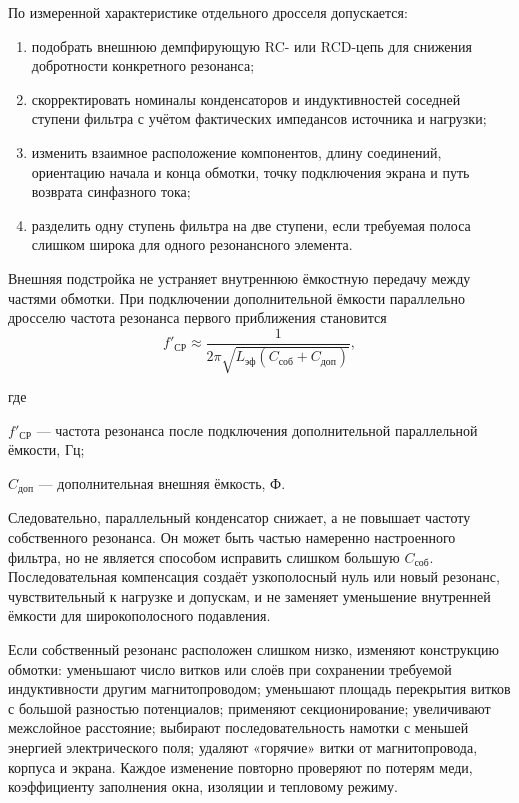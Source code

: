 \documentclass[14pt,a4paper]{extarticle}
\newenvironment{whereblock}
 {\par\noindent где\par
  \begin{list}{}{\setlength{\leftmargin}{12.5mm}
                  \setlength{\itemindent}{-12.5mm}
                  \setlength{\itemsep}{0pt}
                  \setlength{\parsep}{0pt}
                  \setlength{\topsep}{0pt}}}
 {\end{list}}
\newcommand{\whereitem}[2]{\item[] #1 --- #2}
\begin{document}
По измеренной характеристике отдельного дросселя допускается:
\begin{enumerate}
\item подобрать внешнюю демпфирующую RC- или RCD-цепь для снижения добротности
конкретного резонанса;
\item скорректировать номиналы конденсаторов и индуктивностей соседней
ступени фильтра с учётом фактических импедансов источника и нагрузки;
\item изменить взаимное расположение компонентов, длину соединений,
ориентацию начала и конца обмотки, точку подключения экрана и путь возврата
синфазного тока;
\item разделить одну ступень фильтра на две ступени, если требуемая полоса
слишком широка для одного резонансного элемента.
\end{enumerate}

Внешняя подстройка не устраняет внутреннюю ёмкостную передачу между частями
обмотки. При подключении дополнительной ёмкости параллельно дросселю частота
резонанса первого приближения становится
\begin{equation}
 f'_{\text{СР}}\approx
 \frac{1}{2\pi\sqrt{L_{\text{эф}}
 \left(C_{\text{соб}}+C_{\text{доп}}\right)}},
 \label{eq:self-resonance-added-capacitance}
\end{equation}
\begin{whereblock}
\whereitem{$f'_{\text{СР}}$}{частота резонанса после подключения
дополнительной параллельной ёмкости, Гц;}
\whereitem{$C_{\text{доп}}$}{дополнительная внешняя ёмкость, Ф.}
\end{whereblock}

Следовательно, параллельный конденсатор снижает, а не повышает частоту
собственного резонанса. Он может быть частью намеренно настроенного фильтра,
но не является способом исправить слишком большую $C_{\text{соб}}$.
Последовательная компенсация создаёт узкополосный нуль или новый резонанс,
чувствительный к нагрузке и допускам, и не заменяет уменьшение внутренней
ёмкости для широкополосного подавления.

Если собственный резонанс расположен слишком низко, изменяют конструкцию
обмотки: уменьшают число витков или слоёв при сохранении требуемой
индуктивности другим магнитопроводом; уменьшают площадь перекрытия витков с
большой разностью потенциалов; применяют секционирование; увеличивают
межслойное расстояние; выбирают последовательность намотки с меньшей энергией
электрического поля; удаляют «горячие» витки от магнитопровода, корпуса и
экрана. Каждое изменение повторно проверяют по потерям меди, коэффициенту
заполнения окна, изоляции и тепловому режиму.
\end{document}
